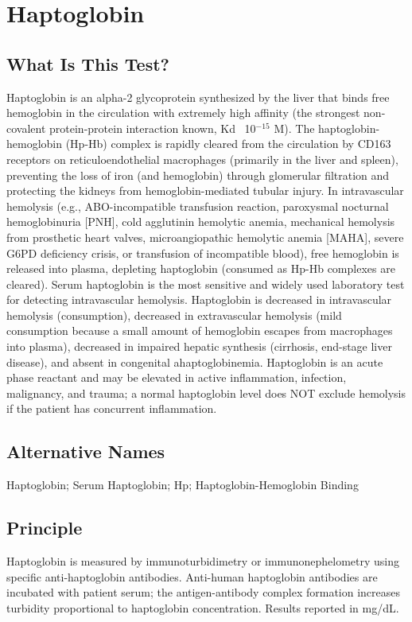 \chapter{Haptoglobin}
\section*{What Is This Test?}
Haptoglobin is an alpha-2 glycoprotein synthesized by the liver that binds free hemoglobin in the circulation with extremely high affinity (the strongest non-covalent protein-protein interaction known, Kd ~10$^{-15}$ M). The haptoglobin-hemoglobin (Hp-Hb) complex is rapidly cleared from the circulation by CD163 receptors on reticuloendothelial macrophages (primarily in the liver and spleen), preventing the loss of iron (and hemoglobin) through glomerular filtration and protecting the kidneys from hemoglobin-mediated tubular injury. In intravascular hemolysis (e.g., ABO-incompatible transfusion reaction, paroxysmal nocturnal hemoglobinuria [PNH], cold agglutinin hemolytic anemia, mechanical hemolysis from prosthetic heart valves, microangiopathic hemolytic anemia [MAHA], severe G6PD deficiency crisis, or transfusion of incompatible blood), free hemoglobin is released into plasma, depleting haptoglobin (consumed as Hp-Hb complexes are cleared). Serum haptoglobin is the most sensitive and widely used laboratory test for detecting intravascular hemolysis. Haptoglobin is decreased in intravascular hemolysis (consumption), decreased in extravascular hemolysis (mild consumption because a small amount of hemoglobin escapes from macrophages into plasma), decreased in impaired hepatic synthesis (cirrhosis, end-stage liver disease), and absent in congenital ahaptoglobinemia. Haptoglobin is an acute phase reactant and may be elevated in active inflammation, infection, malignancy, and trauma; a normal haptoglobin level does NOT exclude hemolysis if the patient has concurrent inflammation.
\section*{Alternative Names}
Haptoglobin; Serum Haptoglobin; Hp; Haptoglobin-Hemoglobin Binding
\section*{Principle}
Haptoglobin is measured by immunoturbidimetry or immunonephelometry using specific anti-haptoglobin antibodies. Anti-human haptoglobin antibodies are incubated with patient serum; the antigen-antibody complex formation increases turbidity proportional to haptoglobin concentration. Results reported in mg/dL.

